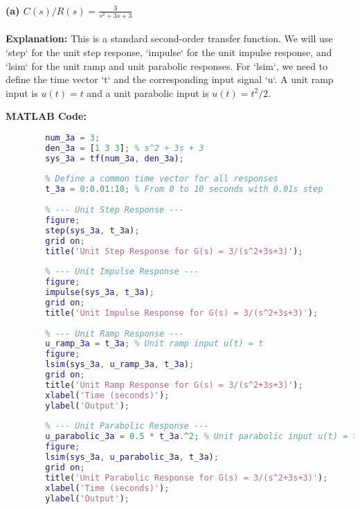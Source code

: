 \documentclass[a4paper,12pt]{article}
\begin{document}
	\paragraph{(a) $C(s)/R(s) = \frac{3}{s^2+3s+3}$}
	\textbf{Explanation:}
	This is a standard second-order transfer function. We will use `step` for the unit step response, `impulse` for the unit impulse response, and `lsim` for the unit ramp and unit parabolic responses. For `lsim`, we need to define the time vector `t` and the corresponding input signal `u`. A unit ramp input is $u(t)=t$ and a unit parabolic input is $u(t) = t^2/2$.
	
	\textbf{MATLAB Code:}
	\begin{lstlisting}[language=Matlab, caption=MATLAB Code for Problem 3(a)]
		% Define the transfer function
		num_3a = 3;
		den_3a = [1 3 3]; % s^2 + 3s + 3
		sys_3a = tf(num_3a, den_3a);
		
		% Define a common time vector for all responses
		t_3a = 0:0.01:10; % From 0 to 10 seconds with 0.01s step
		
		% --- Unit Step Response ---
		figure;
		step(sys_3a, t_3a);
		grid on;
		title('Unit Step Response for G(s) = 3/(s^2+3s+3)');
		
		% --- Unit Impulse Response ---
		figure;
		impulse(sys_3a, t_3a);
		grid on;
		title('Unit Impulse Response for G(s) = 3/(s^2+3s+3)');
		
		% --- Unit Ramp Response ---
		u_ramp_3a = t_3a; % Unit ramp input u(t) = t
		figure;
		lsim(sys_3a, u_ramp_3a, t_3a);
		grid on;
		title('Unit Ramp Response for G(s) = 3/(s^2+3s+3)');
		xlabel('Time (seconds)');
		ylabel('Output');
		
		% --- Unit Parabolic Response ---
		u_parabolic_3a = 0.5 * t_3a.^2; % Unit parabolic input u(t) = t^2/2
		figure;
		lsim(sys_3a, u_parabolic_3a, t_3a);
		grid on;
		title('Unit Parabolic Response for G(s) = 3/(s^2+3s+3)');
		xlabel('Time (seconds)');
		ylabel('Output');
	\end{lstlisting}
	
\end{document}
